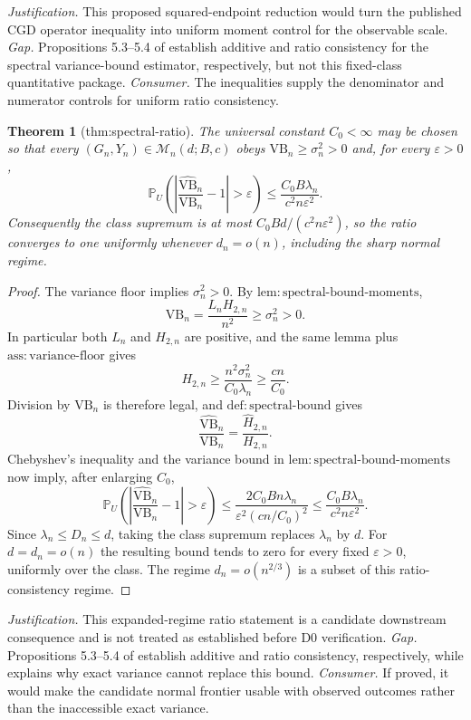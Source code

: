 \documentclass{article}
\newtheorem{theorem}{Theorem}
\begin{document}
\par\smallskip\noindent \textit{Justification.} This proposed squared-endpoint reduction would turn the published CGD operator inequality into uniform moment control for the observable scale. \textit{Gap.} Propositions 5.3--5.4 of \cite{KandirosPipisDaskalakisHarshaw2024CGD} establish additive and ratio consistency for the spectral variance-bound estimator, respectively, but not this fixed-class quantitative package. \textit{Consumer.} The inequalities supply the denominator and numerator controls for uniform ratio consistency.

\begin{theorem}[thm:spectral-ratio]\label{thm:spectral-ratio}
The universal constant \(C_0<\infty\) may be chosen so that every \((G_n,Y_n)\in\mathcal M_n(d;B,c)\) obeys \(\mathrm{VB}_n\ge\sigma_n^2>0\) and, for every \(\varepsilon>0\), \[\mathbb P_U\left(\left|\frac{\widehat{\mathrm{VB}}_n}{\mathrm{VB}_n}-1\right|>\varepsilon\right)\le\frac{C_0B\lambda_n}{c^2n\varepsilon^2}.\] Consequently the class supremum is at most \(C_0Bd/(c^2n\varepsilon^2)\), so the ratio converges to one uniformly whenever \(d_n=o(n)\), including the sharp normal regime.
\end{theorem}
\begin{proof}
The variance floor implies \(\sigma_n^2>0\).  By \(\mathrm{lem:spectral\text{-}bound\text{-}moments}\),
\[
 \mathrm{VB}_n=\frac{L_nH_{2,n}}{n^2}\ge\sigma_n^2>0.
\]
In particular both \(L_n\) and \(H_{2,n}\) are positive, and the same lemma plus \(\mathrm{ass:variance\text{-}floor}\) gives
\[
 H_{2,n}\ge\frac{n^2\sigma_n^2}{C_0\lambda_n}\ge\frac{cn}{C_0}.
\]
Division by \(\mathrm{VB}_n\) is therefore legal, and \(\mathrm{def:spectral\text{-}bound}\) gives
\[
 \frac{\widehat{\mathrm{VB}}_n}{\mathrm{VB}_n}
 =\frac{\widehat H_{2,n}}{H_{2,n}}.
\]
Chebyshev's inequality and the variance bound in \(\mathrm{lem:spectral\text{-}bound\text{-}moments}\) now imply, after enlarging \(C_0\),
\[
 \mathbb P_U\left(\left|\frac{\widehat{\mathrm{VB}}_n}{\mathrm{VB}_n}-1\right|>\varepsilon\right)
 \le\frac{2C_0Bn\lambda_n}{\varepsilon^2(cn/C_0)^2}
 \le\frac{C_0B\lambda_n}{c^2n\varepsilon^2}.
\]
Since \(\lambda_n\le D_n\le d\), taking the class supremum replaces \(\lambda_n\) by \(d\).  For \(d=d_n=o(n)\) the resulting bound tends to zero for every fixed \(\varepsilon>0\), uniformly over the class.  The regime \(d_n=o(n^{2/3})\) is a subset of this ratio-consistency regime.
\end{proof}
\par\smallskip\noindent \textit{Justification.} This expanded-regime ratio statement is a candidate downstream consequence and is not treated as established before D0 verification. \textit{Gap.} Propositions 5.3--5.4 of \cite{KandirosPipisDaskalakisHarshaw2024CGD} establish additive and ratio consistency, respectively, while \cite{HarshawMiddletonSavje2026OptimizedVariance} explains why exact variance cannot replace this bound. \textit{Consumer.} If proved, it would make the candidate normal frontier usable with observed outcomes rather than the inaccessible exact variance.
\end{document}
